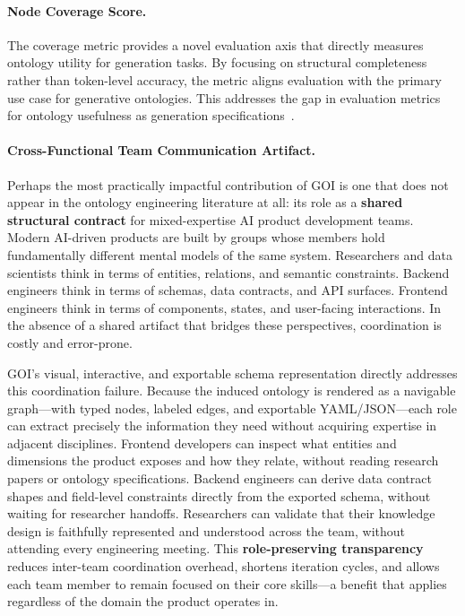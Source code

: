 \documentclass[runningheads,a4paper]{llncs}
\begin{document}
\paragraph{Node Coverage Score.} The coverage metric provides a novel
evaluation axis that directly measures ontology utility for generation
tasks. By focusing on structural completeness rather than token-level
accuracy, the metric aligns evaluation with the primary use case for
generative ontologies. This addresses the gap in evaluation metrics for
ontology usefulness as generation specifications~\cite{lo2024endtoend}.

\paragraph{Cross-Functional Team Communication Artifact.} Perhaps the
most practically impactful contribution of GOI is one that does not
appear in the ontology engineering literature at all: its role as a
\textbf{shared structural contract} for mixed-expertise AI product
development teams. Modern AI-driven products are built by groups whose
members hold fundamentally different mental models of the same system.
Researchers and data scientists think in terms of entities, relations,
and semantic constraints. Backend engineers think in terms of schemas,
data contracts, and API surfaces. Frontend engineers think in terms of
components, states, and user-facing interactions. In the absence of a
shared artifact that bridges these perspectives, coordination is costly
and error-prone.

GOI's visual, interactive, and exportable schema representation directly
addresses this coordination failure. Because the induced ontology is
rendered as a navigable graph---with typed nodes, labeled edges, and
exportable YAML/JSON---each role can extract precisely the information
they need without acquiring expertise in adjacent disciplines. Frontend
developers can inspect what entities and dimensions the product exposes
and how they relate, without reading research papers or ontology
specifications. Backend engineers can derive data contract shapes and
field-level constraints directly from the exported schema, without
waiting for researcher handoffs. Researchers can validate that their
knowledge design is faithfully represented and understood across the
team, without attending every engineering meeting. This
\textbf{role-preserving transparency} reduces inter-team coordination
overhead, shortens iteration cycles, and allows each team member to
remain focused on their core skills---a benefit that applies regardless
of the domain the product operates in.
\end{document}
